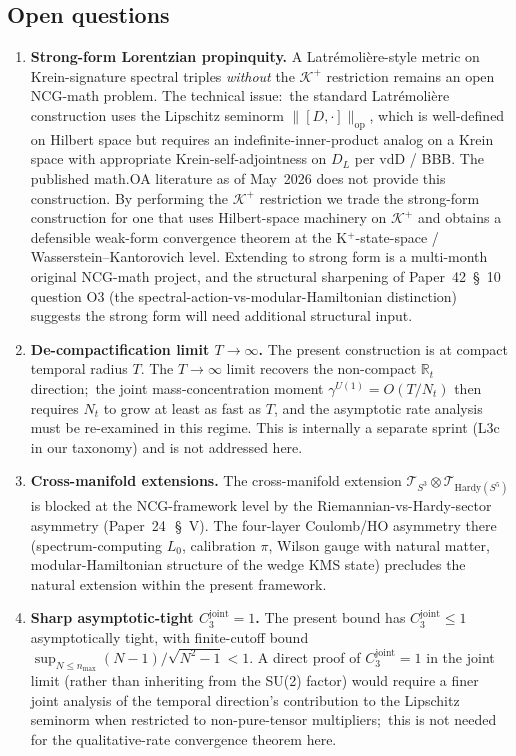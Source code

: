 \documentclass[11pt,a4paper]{article}
\theoremstyle{plain}
\theoremstyle{definition}
\newcommand{\nmax}{n_{\max}}
\newcommand{\Nt}{N_{t}}
\newcommand{\sthree}{S^{3}}
\newcommand{\Krein}{\mathcal{K}}
\newcommand{\Tcal}{\mathcal{T}}
\newcommand{\norm}[1]{\lVert #1 \rVert}
\newcommand{\R}{\mathbb{R}}
\newcommand{\Uone}{U(1)}
\newcommand{\DL}{D_{L}}
\newcommand{\gammaU}{\gamma^{\Uone}}
\newcommand{\Cthreejoint}{C_{3}^{\mathrm{joint}}}
\newcommand{\Kplus}{\Krein^{+}}
\begin{document}
\subsection{Open questions}\label{sec:open}

\begin{enumerate}
\item[(Q1)] \textbf{Strong-form Lorentzian propinquity.} A
Latr\'emoli\`ere-style metric on Krein-signature spectral triples
\emph{without} the $\Kplus$ restriction remains an open NCG-math
problem. The technical issue:\ the standard Latr\'emoli\`ere construction
uses the Lipschitz seminorm $\norm{[D, \cdot]}_{\mathrm{op}}$, which is
well-defined on Hilbert space but requires an indefinite-inner-product
analog on a Krein space with appropriate Krein-self-adjointness on
$\DL$ per vdD / BBB. The published math.OA literature as of May~2026
does not provide this construction. By performing the $\Kplus$
restriction we trade the strong-form construction for one that uses
Hilbert-space machinery on $\Kplus$ and obtains a defensible weak-form
convergence theorem at the K$^{+}$-state-space / Wasserstein--Kantorovich
level. Extending to strong form is a multi-month original NCG-math
project, and the structural sharpening of Paper~42~\S~10 question O3
(the spectral-action-vs-modular-Hamiltonian distinction) suggests the
strong form will need additional structural input.

\item[(Q2)] \textbf{De-compactification limit $T \to \infty$.} The
present construction is at compact temporal radius $T$. The $T \to
\infty$ limit recovers the non-compact $\R_{t}$ direction;\ the joint
mass-concentration moment $\gammaU = O(T/\Nt)$ then requires
$\Nt$ to grow at least as fast as $T$, and the asymptotic rate
analysis must be re-examined in this regime. This is internally a
separate sprint (L3c in our taxonomy) and is not addressed here.

\item[(Q3)] \textbf{Cross-manifold extensions.} The cross-manifold
extension $\Tcal_{\sthree} \otimes \Tcal_{\mathrm{Hardy}(S^{5})}$ is
blocked at the NCG-framework level by the
Riemannian-vs-Hardy-sector asymmetry (Paper~24~\cite{paper24}\,\S~V).
The four-layer Coulomb/HO asymmetry there (spectrum-computing $L_{0}$,
calibration $\pi$, Wilson gauge with natural matter, modular-Hamiltonian
structure of the wedge KMS state) precludes the natural extension
within the present framework.

\item[(Q4)] \textbf{Sharp asymptotic-tight $\Cthreejoint = 1$.} The
present bound has $\Cthreejoint \le 1$ asymptotically tight, with
finite-cutoff bound $\sup_{N \le \nmax} (N-1)/\sqrt{N^{2}-1} < 1$.
A direct proof of $\Cthreejoint = 1$ in the joint limit (rather than
inheriting from the SU(2) factor) would require a finer joint analysis
of the temporal direction's contribution to the Lipschitz seminorm
when restricted to non-pure-tensor multipliers;\ this is not needed
for the qualitative-rate convergence theorem here.


\end{enumerate}
\end{document}
